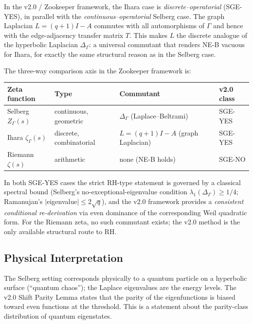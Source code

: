 \documentclass[12pt,a4paper]{article}
\theoremstyle{definition}
\theoremstyle{remark}
\newcommand{\Delop}{\Delta_{\Gamma}}
\begin{document}
\medskip
In the v2.0 / Zookeeper framework, the Ihara case is \emph{discrete--operatorial}
(SGE-YES), in parallel with the \emph{continuous--operatorial} Selberg case.
The graph Laplacian $L = (q+1)I - A$ commutes with all automorphisms of $\Gamma$
and hence with the edge-adjacency transfer matrix $T$.  This makes $L$ the
discrete analogue of the hyperbolic Laplacian $\Delta_\Gamma$: a universal
commutant that renders NE-B vacuous for Ihara, for exactly the same structural
reason as in the Selberg case.

The three-way comparison axis in the Zookeeper framework is:

\begin{center}
\footnotesize
\setlength{\tabcolsep}{4pt}
\begin{tabularx}{\textwidth}{@{}L{2.2cm}L{2.1cm}Y L{1.8cm}@{}}
\toprule
\textbf{Zeta function} & \textbf{Type} & \textbf{Commutant} & \textbf{v2.0 class} \\
\midrule
Selberg $Z_\Gamma(s)$ & continuous, geometric & $\Delta_\Gamma$ (Laplace--Beltrami) & SGE-YES \\
Ihara $\zeta_\Gamma(s)$ & discrete, combinatorial & $L = (q{+}1)I - A$ (graph Laplacian) & SGE-YES \\
Riemann $\zeta(s)$ & arithmetic & none (NE-B holds) & SGE-NO \\
\bottomrule
\end{tabularx}
\end{center}

\medskip\noindent
In both SGE-YES cases the strict RH-type statement is governed by a classical
spectral bound (Selberg's no-exceptional-eigenvalue condition
$\lambda_1(\Delop)\ge 1/4$; Ramanujan's $|$eigenvalue$| \le 2\sqrt{q}$),
and the v2.0 framework provides a \emph{consistent conditional re-derivation} via even dominance
of the corresponding Weil quadratic form.  For the Riemann zeta, no such
commutant exists; the v2.0 method is the only available structural route to RH.

\subsection{Physical Interpretation}

The Selberg setting corresponds physically to a quantum particle on a
hyperbolic surface (``quantum chaos''); the Laplace eigenvalues are the
energy levels. The v2.0 Shift Parity Lemma states that the parity of the
eigenfunctions is biased toward even functions at the threshold. This is a
statement about the parity-class distribution of quantum eigenstates.
\end{document}
